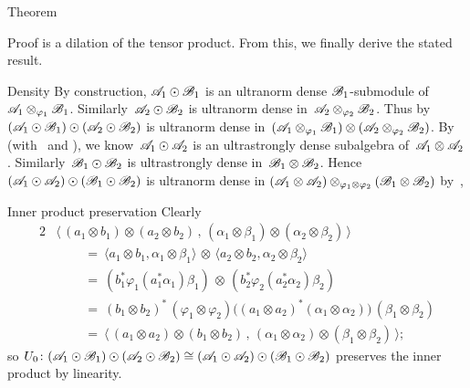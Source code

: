 \begin{parsec}
\begin{point}{Theorem}
\begin{point}{Proof}
    is a dilation of the tensor product.
    From this, we finally derive the stated result.
\begin{point}{Density}%
By construction, $\mathscr{A}_1 \odot \mathscr{B}_1$ is an ultranorm dense
        $\mathscr{B}_1$-submodule
    of~$\mathscr{A}_1 \otimes_{\varphi_1} \mathscr{B}_1$.
Similarly~$\mathscr{A}_2 \odot \mathscr{B}_2 $ is ultranorm dense
    in~$\mathscr{A}_2 \otimes_{\varphi_2} \mathscr{B}_2$.
Thus by 
    $(\mathscr{A}_1 \odot \mathscr{B}_1) \odot(
    \mathscr{A}_2 \odot \mathscr{B}_2) $ is ultranorm dense in~$(\mathscr{A}_1 \otimes_{\varphi_1} \mathscr{B}_1)
\otimes (\mathscr{A}_2 \otimes_{\varphi_2} \mathscr{B}_2)$.
By 
        (with~ and ),
    we know~$\mathscr{A}_1 \odot \mathscr{A}_2$
    is an ultrastrongly dense subalgebra
    of~$\mathscr{A}_1 \otimes \mathscr{A}_2$.
Similarly~$\mathscr{B}_1 \odot \mathscr{B}_2$
    is ultrastrongly dense in~$\mathscr{B}_1 \otimes \mathscr{B}_2$.
Hence~$(\mathscr{A}_1 \odot \mathscr{A}_2) \odot 
    (\mathscr{B}_1 \odot \mathscr{B}_2)$ is ultranorm dense
    in
    $(\mathscr{A}_1 \otimes \mathscr{A}_2) \otimes_{\varphi_1 \otimes \varphi_2}
    (\mathscr{B}_1 \otimes \mathscr{B}_2)$
        by~,
\end{point}
\begin{point}{Inner product preservation}%
Clearly
\begin{alignat*}{2}
    &
    \bigl\langle\,
    (a_1 \otimes b_1)\otimes (a_2 \otimes b_2)\,,\,
    (\alpha_1 \otimes \beta_1 )\otimes( \alpha_2 \otimes \beta_2)
    \,\bigr\rangle \\
    & \qquad\ = \ 
    \langle a_1 \otimes b_1 , \alpha_1 \otimes \beta_1 \rangle \,\otimes\,
    \langle a_2 \otimes b_2 , \alpha_2 \otimes \beta_2 \rangle \\
    & \qquad\ = \ 
    (b_1^* \varphi_1( a_1^* \alpha_1) \beta_1)
    \,\otimes \,
    (b_2^* \varphi_2( a_2^* \alpha_2) \beta_2) \\
    & \qquad \ = \ 
    (b_1 \otimes b_2)^* \,(\varphi_1 \otimes \varphi_2)
    \bigl((a_1 \otimes a_2)^* (\alpha_1 \otimes \alpha_2)\bigr)
    \,(\beta_1 \otimes \beta_2) \\
    & \qquad \ = \ 
    \bigl\langle\,
    (a_1\otimes a_2)\otimes (b_1 \otimes b_2) \,,\,
    (\alpha_1\otimes \alpha_2)\otimes (\beta_1 \otimes \beta_2)
    \,\bigr\rangle;
\end{alignat*}
so $U_0 \colon (\mathscr{A}_1 \odot \mathscr{B}_1) \odot (\mathscr{A}_2 \odot \mathscr{B}_2) \cong
(\mathscr{A}_1 \odot \mathscr{A}_2) \odot (\mathscr{B}_1 \odot \mathscr{B}_2) $
preserves the inner product by linearity.
\end{point}

\end{point}
\end{point}
\end{parsec}
